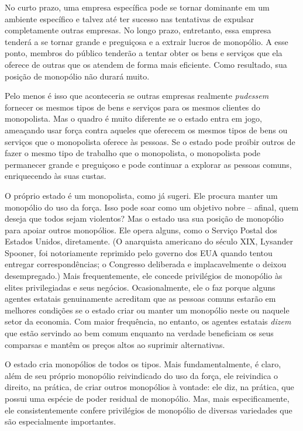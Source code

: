 No curto prazo, uma empresa específica pode se tornar dominante em um ambiente específico e talvez até ter sucesso nas tentativas de expulsar completamente outras empresas. No longo prazo, entretanto, essa empresa tenderá a se tornar grande e preguiçosa e a extrair lucros de monopólio. A esse ponto, membros do público tenderão a tentar obter os bens e serviços que ela oferece de outras que os atendem de forma mais eficiente. Como resultado, sua posição de monopólio não durará muito.

Pelo menos é isso que aconteceria se outras empresas realmente \emph{pudessem} fornecer os mesmos tipos de bens e serviços para os mesmos clientes do monopolista. Mas o quadro é muito diferente se o estado entra em jogo, ameaçando usar força contra aqueles que oferecem os mesmos tipos de bens ou serviços que o monopolista oferece às pessoas. Se o estado pode proibir outros de fazer o mesmo tipo de trabalho que o monopolista, o monopolista pode permanecer grande e preguiçoso e pode continuar a explorar as pessoas comuns, enriquecendo às suas custas.

O próprio estado é um monopolista, como já sugeri. Ele procura manter um monopólio do uso da força. Isso pode soar como um objetivo nobre -- afinal, quem deseja que todos sejam violentos? Mas o estado usa sua posição de monopólio para apoiar outros monopólios. Ele opera alguns, como o Serviço Postal dos Estados Unidos, diretamente. (O anarquista americano do século XIX, Lysander Spooner, foi notoriamente reprimido pelo governo dos EUA quando tentou entregar correspondências; o Congresso deliberada e implacavelmente o deixou desempregado.) Mais frequentemente, ele concede privilégios de monopólio às elites privilegiadas e seus negócios. Ocasionalmente, ele o faz porque alguns agentes estatais genuinamente acreditam que as pessoas comuns estarão em melhores condições se o estado criar ou manter um monopólio neste ou naquele setor da economia. Com maior frequência, no entanto, os agentes estatais \emph{dizem} que estão servindo ao bem comum enquanto na verdade beneficiam os seus comparsas e mantêm os preços altos ao suprimir alternativas.

O estado cria monopólios de todos os tipos. Mais fundamentalmente, é claro, além de seu próprio monopólio reivindicado do uso da força, ele reivindica o direito, na prática, de criar outros monopólios à vontade: ele diz, na prática, que possui uma espécie de poder residual de monopólio. Mas, mais especificamente, ele consistentemente confere privilégios de monopólio de diversas variedades que são especialmente importantes.

